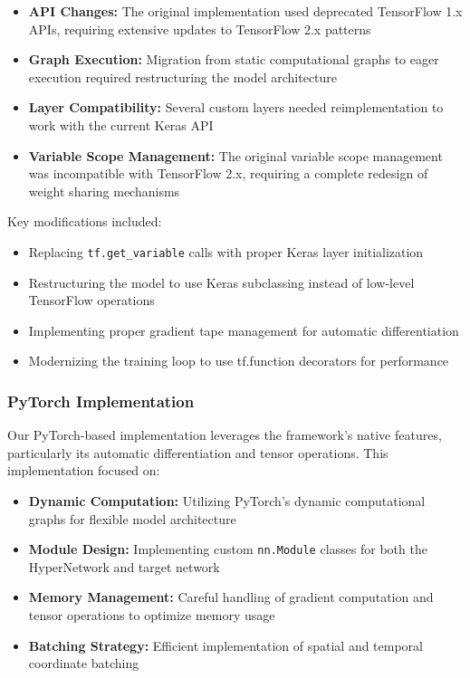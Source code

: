 \documentclass[10pt,journal,compsoc]{IEEEtran}
\begin{document}
\begin{itemize}
    \item \textbf{API Changes:} The original implementation used deprecated TensorFlow 1.x APIs, requiring extensive updates to TensorFlow 2.x patterns
    \item \textbf{Graph Execution:} Migration from static computational graphs to eager execution required restructuring the model architecture
    \item \textbf{Layer Compatibility:} Several custom layers needed reimplementation to work with the current Keras API
    \item \textbf{Variable Scope Management:} The original variable scope management was incompatible with TensorFlow 2.x, requiring a complete redesign of weight sharing mechanisms
\end{itemize}

Key modifications included:
\begin{itemize}
    \item Replacing \texttt{tf.get\_variable} calls with proper Keras layer initialization
    \item Restructuring the model to use Keras subclassing instead of low-level TensorFlow operations
    \item Implementing proper gradient tape management for automatic differentiation
    \item Modernizing the training loop to use tf.function decorators for performance
\end{itemize}

\subsubsection{PyTorch Implementation}
Our PyTorch-based implementation leverages the framework's native features, particularly its automatic differentiation and tensor operations. This implementation focused on:

\begin{itemize}
    \item \textbf{Dynamic Computation:} Utilizing PyTorch's dynamic computational graphs for flexible model architecture
    \item \textbf{Module Design:} Implementing custom \texttt{nn.Module} classes for both the HyperNetwork and target network
    \item \textbf{Memory Management:} Careful handling of gradient computation and tensor operations to optimize memory usage
    \item \textbf{Batching Strategy:} Efficient implementation of spatial and temporal coordinate batching
\end{itemize}
\end{document}
